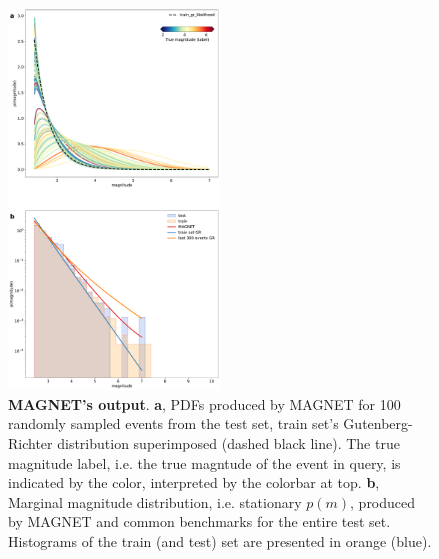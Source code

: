 \documentclass[pdflatex]{sn-jnl}
\begin{document}
\begin{figure}[h!]
    \centering
    \includegraphics[width=0.5\textwidth]{figures/raw_results.pdf}
    \caption{
        \textbf{MAGNET's output}. \textbf{a}, PDFs produced by MAGNET for 100 randomly sampled events from the test set, train set's Gutenberg-Richter distribution superimposed (dashed black line). The true magnitude label, i.e. the true magntude of the event in query, is indicated by the color, interpreted by the colorbar at top. \textbf{b}, Marginal magnitude distribution, i.e. stationary $p(m)$, produced by MAGNET and common benchmarks for the entire test set. Histograms of the train (and test) set are presented in orange (blue).
    }
    \label{fig:model_output}
\end{figure}
\end{document}
